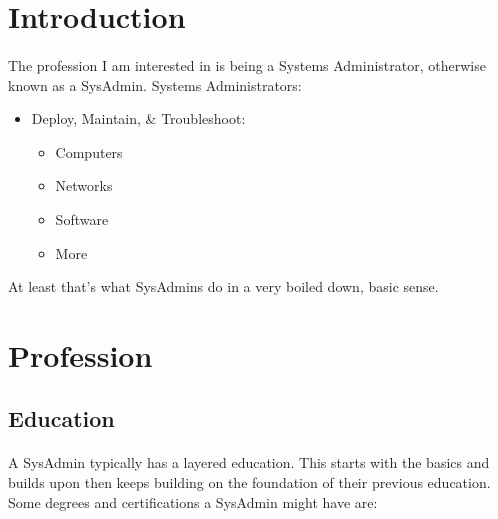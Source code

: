\section{Introduction}
\paragraph{}
The profession I am interested in is being a Systems Administrator, otherwise
known as a SysAdmin. Systems Administrators:


\begin{itemize}
	\item{Deploy, Maintain, \& Troubleshoot:}
		\begin{itemize}
			\item{Computers}
			\item{Networks}
			\item{Software}
			\item{More}
		\end{itemize}
\end{itemize}

At least that's what SysAdmins do in a very boiled down, basic sense.
\par
\section{Profession}

\subsection{Education}
\paragraph{}

A SysAdmin typically has a layered education. This starts with the basics and
builds upon then keeps building on the foundation of their previous education.
Some degrees and certifications a SysAdmin might have are:

